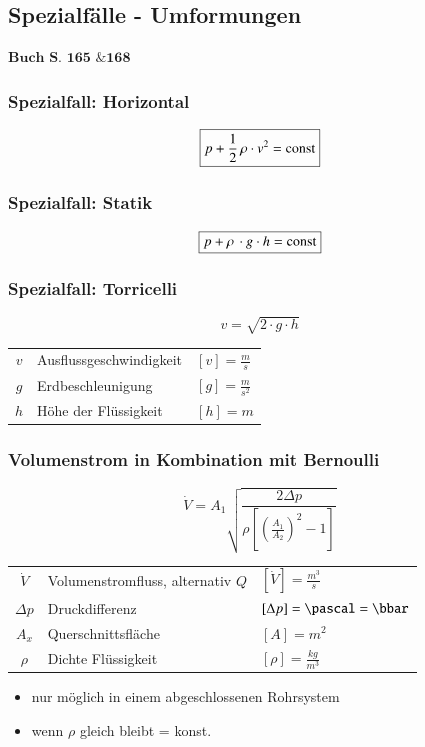 \subsection{Spezialfälle - Umformungen}
\begin{flushright}
	$\boxed{\textbf{Buch S. 165 \& 168}}$
\end{flushright}

\begin{minipage}[t]{0.48\columnwidth}
	\subsubsection{Spezialfall: Horizontal}

	$$ \boxed{ p + \frac{1}{2} \, \rho \cdot v^2 = \mathop{} \! \mathrm{const} } $$
\end{minipage}
\hfill
\begin{minipage}[t]{0.48\columnwidth}
	\subsubsection{Spezialfall: Statik}

	$$ \boxed{ p + \rho \, \cdot g \cdot h =  \mathop{} \! \mathrm{const}} $$
\end{minipage}


\subsubsection{Spezialfall: Torricelli}

$$ \boxed {v=\sqrt{2 \cdot g \cdot h}}$$

\begin{tabular}{c l l}
	$v$ & Ausflussgeschwindigkeit & $[v] = \frac{m}{s}$   \\
	$g$ & Erdbeschleunigung       & $[g] = \frac{m}{s^2}$ \\
	$h$ & Höhe der Flüssigkeit    & $[h] = m$
\end{tabular}

\subsubsection{Volumenstrom in Kombination mit Bernoulli}

$$ \boxed{\dot{V} = A_1 \sqrt{\frac{2 \Delta p}{\rho \left[ \left( \frac{A_1}{A_2} \right)^2 - 1 \right]}}}$$

\begin{tabular}{c l l}
	$\dot{V}$  & Volumenstromfluss, alternativ $Q$ & $[\dot{V}] = \frac{m^3}{s}$    \\
	$\Delta p$ & Druckdifferenz                    & $[\Delta p] = \pascal = \bbar$ \\
	  $A_x$    & Querschnittsfläche                & $[A] = m^2$                    \\
	  $\rho$   & Dichte Flüssigkeit                & $[\rho] = \frac{kg}{m^3}$
\end{tabular}
\vspace{0.2cm}
\begin{itemize}
	\item nur möglich in einem abgeschlossenen Rohrsystem 
	\item wenn $\rho$ gleich bleibt = konst.
\end{itemize}

